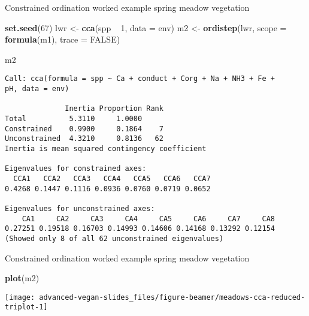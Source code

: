 \documentclass[10pt,ignorenonframetext,compress, aspectratio=169]{beamer}
\newenvironment{Shaded}{\begin{snugshade}}{\end{snugshade}}
\newcommand{\KeywordTok}[1]{\textcolor[rgb]{0.13,0.29,0.53}{\textbf{{#1}}}}
\newcommand{\DataTypeTok}[1]{\textcolor[rgb]{0.13,0.29,0.53}{{#1}}}
\newcommand{\DecValTok}[1]{\textcolor[rgb]{0.00,0.00,0.81}{{#1}}}
\newcommand{\StringTok}[1]{\textcolor[rgb]{0.31,0.60,0.02}{{#1}}}
\newcommand{\OtherTok}[1]{\textcolor[rgb]{0.56,0.35,0.01}{{#1}}}
\newcommand{\NormalTok}[1]{{#1}}
\begin{document}
\begin{frame}[fragile]{Constrained ordination worked example \textbar{}
spring meadow vegetation}

\tiny

\begin{Shaded}
\begin{Highlighting}[]
\KeywordTok{set.seed}\NormalTok{(}\DecValTok{67}\NormalTok{)}
\NormalTok{lwr <-}\StringTok{ }\KeywordTok{cca}\NormalTok{(spp ~}\StringTok{ }\DecValTok{1}\NormalTok{, }\DataTypeTok{data =} \NormalTok{env)}
\NormalTok{m2 <-}\StringTok{ }\KeywordTok{ordistep}\NormalTok{(lwr, }\DataTypeTok{scope =} \KeywordTok{formula}\NormalTok{(m1), }\DataTypeTok{trace =} \OtherTok{FALSE}\NormalTok{)}
\end{Highlighting}
\end{Shaded}

\begin{Shaded}
\begin{Highlighting}[]
\NormalTok{m2}
\end{Highlighting}
\end{Shaded}

\begin{verbatim}
Call: cca(formula = spp ~ Ca + conduct + Corg + Na + NH3 + Fe +
pH, data = env)

              Inertia Proportion Rank
Total          5.3110     1.0000     
Constrained    0.9900     0.1864    7
Unconstrained  4.3210     0.8136   62
Inertia is mean squared contingency coefficient 

Eigenvalues for constrained axes:
  CCA1   CCA2   CCA3   CCA4   CCA5   CCA6   CCA7 
0.4268 0.1447 0.1116 0.0936 0.0760 0.0719 0.0652 

Eigenvalues for unconstrained axes:
    CA1     CA2     CA3     CA4     CA5     CA6     CA7     CA8 
0.27251 0.19518 0.16703 0.14993 0.14606 0.14168 0.13292 0.12154 
(Showed only 8 of all 62 unconstrained eigenvalues)
\end{verbatim}

\normalsize

\end{frame}

\begin{frame}[fragile]{Constrained ordination worked example \textbar{}
spring meadow vegetation}

\scriptsize

\begin{Shaded}
\begin{Highlighting}[]
\KeywordTok{plot}\NormalTok{(m2)}
\end{Highlighting}
\end{Shaded}

\begin{center}\texttt{[image: advanced-vegan-slides\_files/figure-beamer/meadows-cca-reduced-triplot-1]} \end{center}

\normalsize

\end{frame}
\end{document}
